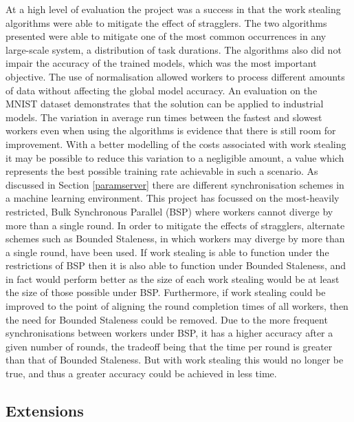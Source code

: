 \documentclass[12pt]{article}
\begin{document}
At a high level of evaluation the project was a success in that the work stealing algorithms were able to mitigate the effect of stragglers. The two algorithms presented were able to mitigate one of the most common occurrences in any large-scale system, a distribution of task durations. The algorithms also did not impair the accuracy of the trained models, which was the most important objective. The use of normalisation allowed workers to process different amounts of data without affecting the global model accuracy. An evaluation on the MNIST dataset demonstrates that the solution can be applied to industrial models. 
\newline
\newline
The variation in average run times between the fastest and slowest workers even when using the algorithms is evidence that there is still room for improvement. With a better modelling of the costs associated with work stealing it may be possible to reduce this variation to a negligible amount, a value which represents the best possible training rate achievable in such a scenario.
\newline
\newline
As discussed in Section \ref{paramserver} there are different synchronisation schemes in a machine learning environment. This project has focussed on the most-heavily restricted, Bulk Synchronous Parallel (BSP) where workers cannot diverge by more than a single round. In order to mitigate the effects of stragglers, alternate schemes such as Bounded Staleness, in which workers may diverge by more than a single round, have been used. If work stealing is able to function under the restrictions of BSP then it is also able to function under Bounded Staleness, and in fact would perform better as the size of each work stealing would be at least the size of those possible under BSP. Furthermore, if work stealing could be improved to the point of aligning the round completion times of all workers, then the need for Bounded Staleness could be removed. Due to the more frequent synchronisations between workers under BSP, it has a higher accuracy after a given number of rounds, the tradeoff being that the time per round is greater than that of Bounded Staleness. But with work stealing this would no longer be true, and thus a greater accuracy could be achieved in less time.

\subsection{Extensions}
\end{document}
